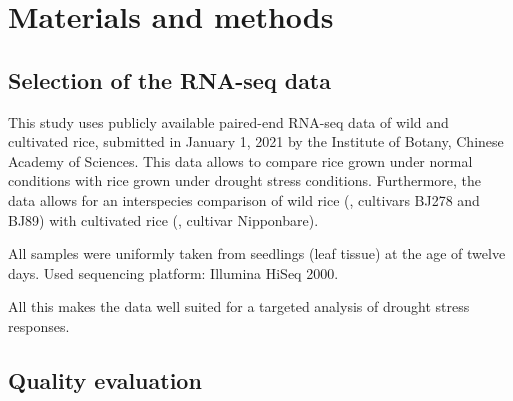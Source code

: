 \section{Materials and methods}

\subsection{Selection of the RNA-seq data}

This study uses publicly available paired-end RNA-seq data of wild and cultivated rice, submitted in January 1, 2021 by the Institute of Botany, Chinese Academy of Sciences. This data allows to compare rice grown under normal conditions with rice grown under drought stress conditions. Furthermore, the data allows for an interspecies comparison of wild rice (, cultivars BJ278 and BJ89) with cultivated rice (, cultivar Nipponbare).

All samples were uniformly taken from seedlings (leaf tissue) at the age of twelve days. Used sequencing platform: Illumina HiSeq 2000.

All this makes the data well suited for a targeted analysis of drought stress responses.


\subsection{Quality evaluation}

